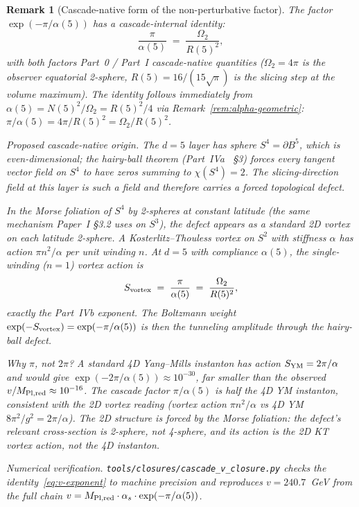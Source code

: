 \documentclass[12pt,a4paper]{article}
\newtheorem*{remark}{Remark}
\begin{document}
\begin{remark}[Cascade-native form of the non-perturbative factor]
\label{rem:v-closure}
The factor $\exp(-\pi/\alpha(5))$ has a cascade-internal identity:
\begin{equation}
\label{eq:v-exponent}
\frac{\pi}{\alpha(5)} \;=\; \frac{\Omega_2}{R(5)^2},
\end{equation}
with both factors Part~0 / Part~I cascade-native quantities ($\Omega_2 = 4\pi$ is
the observer equatorial 2-sphere, $R(5) = 16/(15\sqrt{\pi})$ is the slicing
step at the volume maximum). The identity follows immediately from
$\alpha(5) = N(5)^2/\Omega_2 = R(5)^2/4$ via Remark~\ref{rem:alpha-geometric}:
$\pi/\alpha(5) = 4\pi/R(5)^2 = \Omega_2/R(5)^2$.

\emph{Proposed cascade-native origin.} The $d=5$ layer has sphere
$S^4 = \partial B^5$, which is even-dimensional; the hairy-ball theorem
(Part~IVa~\cite{part4a} \S3) forces every tangent vector field on $S^4$
to have zeros summing to $\chi(S^4) = 2$. The slicing-direction field at
this layer is such a field and therefore carries a forced topological
defect.

In the Morse foliation of $S^4$ by 2-spheres at constant latitude (the same
mechanism Paper~I \S3.2 uses on $S^3$), the defect appears as a standard
2D vortex on each latitude 2-sphere. A Kosterlitz--Thouless vortex on $S^2$
with stiffness $\alpha$ has action $\pi n^2/\alpha$ per unit winding $n$.
At $d = 5$ with compliance $\alpha(5)$, the single-winding ($n=1$) vortex
action is
\[
S_{\rm vortex} \;=\; \frac{\pi}{\alpha(5)} \;=\; \frac{\Omega_2}{R(5)^2},
\]
exactly the Part~IVb exponent. The Boltzmann weight
$\exp(-S_{\rm vortex}) = \exp(-\pi/\alpha(5))$ is then the tunneling
amplitude through the hairy-ball defect.

\emph{Why $\pi$, not $2\pi$?} A standard 4D Yang--Mills instanton has
action $S_{\rm YM} = 2\pi/\alpha$ and would give $\exp(-2\pi/\alpha(5))
\approx 10^{-30}$, far smaller than the observed $v/M_{\rm Pl,red}
\approx 10^{-16}$. The cascade factor $\pi/\alpha(5)$ is \emph{half} the
4D YM instanton, consistent with the 2D vortex reading (vortex action
$\pi n^2/\alpha$ vs 4D YM $8\pi^2/g^2 = 2\pi/\alpha$). The 2D structure
is forced by the Morse foliation: the defect's relevant cross-section
is 2-sphere, not 4-sphere, and its action is the 2D KT vortex action,
not the 4D instanton.

\emph{Numerical verification.} \texttt{tools/closures/cascade\_v\_closure.py}
checks the identity~\eqref{eq:v-exponent} to machine precision and
reproduces $v = 240.7$~GeV from the full chain
$v = M_{\rm Pl,red}\cdot\alpha_s\cdot\exp(-\pi/\alpha(5))$.


\end{remark}
\end{document}
